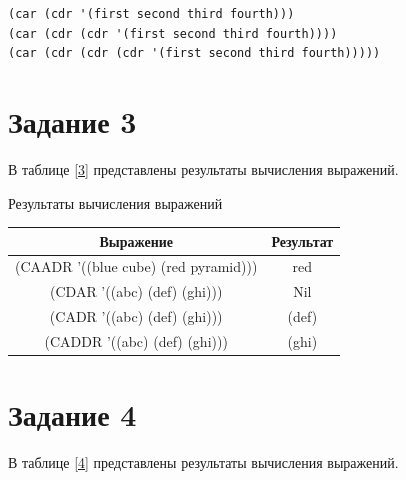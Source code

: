 \begin{lstlisting}
(car (cdr '(first second third fourth)))
(car (cdr (cdr '(first second third fourth))))
(car (cdr (cdr (cdr '(first second third fourth)))))
\end{lstlisting}

\section{Задание 3}

В таблице \ref{3} представлены результаты вычисления выражений.

\begin{center}
	\begin{threeparttable}
		\captionsetup{justification=raggedright,singlelinecheck=off}
		\caption{\label{3}Результаты вычисления выражений}
		\centering
		\begin{tabular}{|c|c|}
			\hline
			Выражение & Результат \\
			\hline
			(CAADR '((blue cube) (red pyramid))) & red \\
			\hline
			(CDAR '((abc) (def) (ghi))) & Nil \\
			\hline
			(CADR '((abc) (def) (ghi))) & (def) \\
			\hline
			(CADDR '((abc) (def) (ghi))) & (ghi) \\
			\hline
		\end{tabular}
	\end{threeparttable}
\end{center}

\section{Задание 4}

В таблице \ref{4} представлены результаты вычисления выражений.

